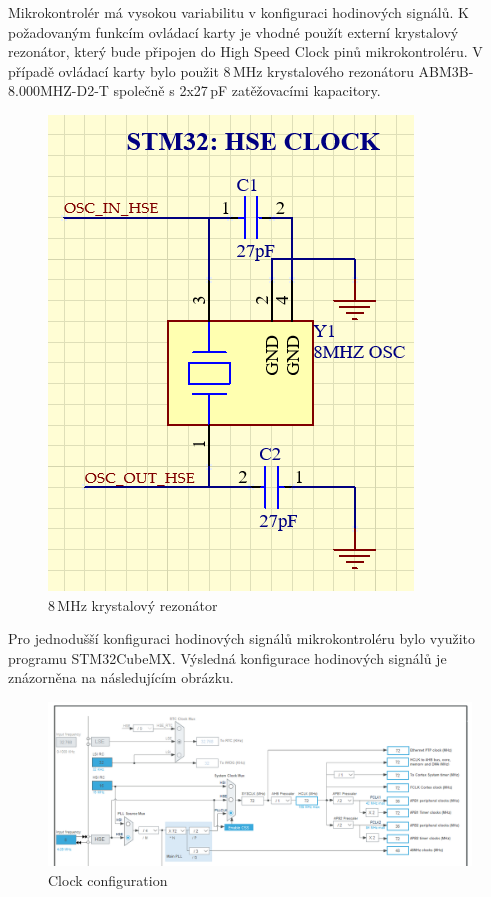     Mikrokontrolér má vysokou variabilitu v konfiguraci hodinových signálů.
    K požadovaným funkcím ovládací karty je vhodné použít externí krystalový rezonátor, který bude
    připojen do High Speed Clock pinů mikrokontroléru. V případě ovládací karty bylo použit 8\,MHz
    krystalového rezonátoru ABM3B-8.000MHZ-D2-T společně s 2x27\,pF zatěžovacími kapacitory.\\

    \begin{figure}[ht!]
        \centering
        \includegraphics[height = 0.2\textheight]{obrazky/CLK_rezonator.png}
        \caption{8\,MHz krystalový rezonátor}
        \label{fig: MHz krystalový rezonátor}
    \end{figure}

    Pro jednodušší konfiguraci hodinových signálů mikrokontroléru bylo využito programu STM32CubeMX.
    Výsledná konfigurace hodinových signálů je znázorněna na následujícím obrázku.

    \begin{figure}[ht!]
        \centering
        \includegraphics[width = 1\textwidth]{obrazky/CLK_config.png}
        \caption{Clock configuration}
        \label{fig: Clock configuration}
    \end{figure}

